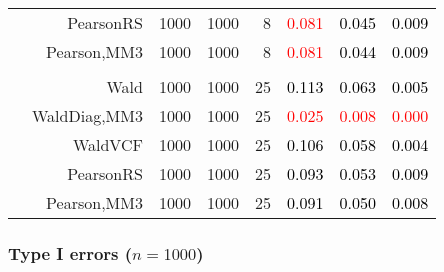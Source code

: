 \documentclass[
]{article}
\begin{document}
\begin{table}[H]
{\begin{tabular}[t]{lrrrrrrr}
\hspace{1em} & PearsonRS & 1000 & 1000 & 8 & \textcolor{red}{0.081} & \textcolor{black}{0.045} & \textcolor{black}{0.009}\\

\hspace{1em} & Pearson,MM3 & 1000 & 1000 & 8 & \textcolor{red}{0.081} & \textcolor{black}{0.044} & \textcolor{black}{0.009}\\
\cmidrule{1-8}
\addlinespace[0.3em]
\multicolumn{8}{l}{\textbf{3F 15V}}\\
\hspace{1em} & Wald & 1000 & 1000 & 25 & \textcolor{black}{0.113} & \textcolor{black}{0.063} & \textcolor{black}{0.005}\\

\hspace{1em} & WaldDiag,MM3 & 1000 & 1000 & 25 & \textcolor{red}{0.025} & \textcolor{red}{0.008} & \textcolor{red}{0.000}\\

\hspace{1em} & WaldVCF & 1000 & 1000 & 25 & \textcolor{black}{0.106} & \textcolor{black}{0.058} & \textcolor{black}{0.004}\\

\hspace{1em} & PearsonRS & 1000 & 1000 & 25 & \textcolor{black}{0.093} & \textcolor{black}{0.053} & \textcolor{black}{0.009}\\

\hspace{1em} & Pearson,MM3 & 1000 & 1000 & 25 & \textcolor{black}{0.091} & \textcolor{black}{0.050} & \textcolor{black}{0.008}\\
\bottomrule
\end{tabular}}
\endgroup{}
\end{table}

\hypertarget{type-i-errors-n1000}{%
\subsubsection{\texorpdfstring{Type I errors
(\(n=1000\))}{Type I errors (n=1000)}}\label{type-i-errors-n1000}}
\end{document}

